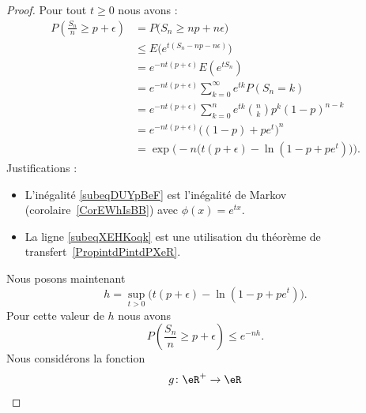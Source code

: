 \begin{proof}
	Pour tout \( t\geq 0\) nous avons :
	\begin{subequations}
		\begin{align}
			P\left( \frac{ S_n }{ n }\geq p+\epsilon \right) & =P\big( S_n\geq np+n\epsilon \big)                                              \\
			                                                 & \leq E\Big(  e^{t(S_n-np-n\epsilon)} \Big)        \label{subeqDUYpBeF}          \\
			                                                 & = e^{-nt(p+\epsilon)}E\left(  e^{tS_n} \right)                                  \\
			                                                 & = e^{-nt(p+\epsilon)}\sum_{k=0}^{\infty} e^{tk}P(S_n=k)    \label{subeqXEHKoqk} \\
			                                                 & = e^{-nt(p+\epsilon)}\sum_{k=0}^{n} e^{tk}\binom{n}{k}p^k(1-p)^{n-k}            \\
			                                                 & = e^{-nt(p+\epsilon)}\big( (1-p)+pe^t \big)^n                                   \\
			                                                 & =\exp\Big( -n\big( t(p+\epsilon)-\ln(1-p+pe^t) \big) \Big).
		\end{align}
	\end{subequations}
	Justifications :
	\begin{itemize}
		\item
		      L'inégalité \eqref{subeqDUYpBeF} est l'inégalité de Markov (corolaire~\ref{CorEWhIsBB}) avec \( \phi(x)= e^{tx}\).
		\item
		      La ligne \eqref{subeqXEHKoqk} est une utilisation du théorème de transfert~\ref{PropintdPintdPXeR}.
	\end{itemize}
	Nous posons maintenant
	\begin{equation}
		h=\sup_{t>0}\big( t(p+\epsilon)-\ln(1-p+pe^t) \big).
	\end{equation}
	Pour cette valeur de \( h\) nous avons
	\begin{equation}
		P\left( \frac{ S_n }{ n }\geq p+\epsilon \right)\leq e^{-nh}.
	\end{equation}
	Nous considérons la fonction
	\begin{equation}
		\begin{aligned}
			g\colon \eR^+ & \to \eR                              \\

\end{aligned}
\end{equation}
\end{proof}
